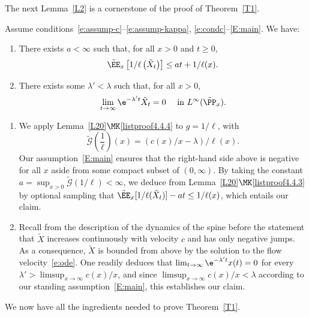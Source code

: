 The next Lemma~\ref{L2} is a cornerstone of the proof of Theorem~\ref{T1}.

\begin{lemm}\label{L2}
Assume conditions~\eqref{e:assump-c}--\eqref{e:assump-kappa}, \eqref{e:condc}--\eqref{E:main}. We have:
\begin{enumerate}
\item \label{list4.7.1}There exists $a<\infty$ such that, for all $x>0$ and $t\geq 0$,
\[
\tilde \EE_x\left[1/\ell\left(\tilde X_t\right)\right]\leq at + 1/\ell(x).
\]
\item \label{list4.7.2}There exists some $\lambda'<\lambda$ such that, for all $x>0$,
\[
\lim_{t\to \infty} \e^{-\lambda' t} \tilde X_t=0\quad \text{ in }
L^{\infty}(\tilde \PP_x).
\]
\end{enumerate}
\end{lemm}

\begin{proofc}
\begin{enumerate}
\item \label{listproof4.7.1}We apply Lemma~\ref{L20}$\MK$\eqref{listproof4.4.4} to $g=1/\ell$, with
\[
\tilde {\mathcal G}\left(\frac{1}{\ell}\right) (x)= (c(x)/x-\lambda)/\ell(x).
\]
Our assumption~\eqref{E:main} ensures that the right-hand side above is negative for all $x$ aside from some compact subset of $(0,\infty)$. By taking the constant $a=\sup_{x>0} \tilde {\mathcal G}\left(1/{\ell}\right) <\infty$, we deduce from Lemma~\ref{L20}$\MK$\eqref{listproof4.4.3} by optional sampling that $\tilde \EE_x[1/\ell(\tilde X_t)] -at \leq 1/\ell(x)$, which entails our claim.

\item \label{listproof4.7.2}Recall from the description of the dynamics of the spine before the statement that $\tilde X$ increases continuously with velocity $c$ and has only negative jumps. As a consequence, $\tilde X$ is bounded from above by the solution to the flow velocity~\eqref{e:ode}. One readily deduces that $\lim_{t\to \infty} \e^{-\lambda' t}x(t)=0$ for every $\lambda' >\limsup_{x\to \infty} c(x)/x$, and since $\limsup_{x\to \infty} c(x)/x<\lambda$ according to our standing assumption~\eqref{E:main}, this establishes our claim.\qedhere
\end{enumerate}
\end{proofc}

\goodbreak

We now have all the ingredients needed to prove Theorem~\ref{T1}.

